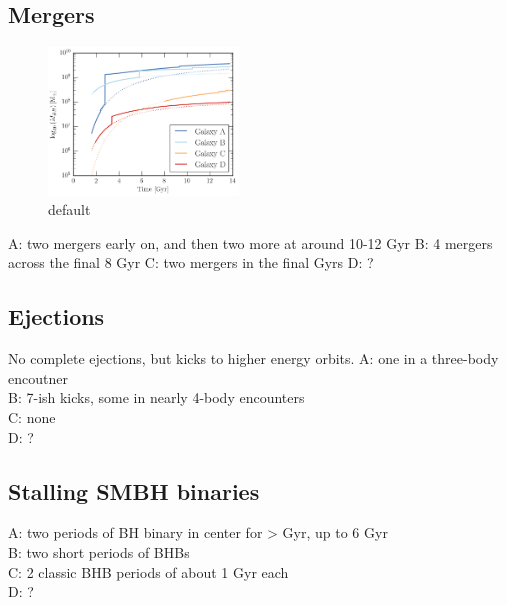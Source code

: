 \documentclass[english, apj]{emulateapj}
\begin{document}
\subsection{Mergers}
\begin{figure}[htbp]
\begin{center}
\includegraphics[width=0.45\textwidth]{plots/masses_ABCD.png}
\caption{default}
\label{default4}
\end{center}
\end{figure}




\noindent A: two mergers early on, and then two more at around 10-12 Gyr
B: 4 mergers across the final 8 Gyr
C: two mergers in the final Gyrs
D: ?


\subsection{Ejections}
No complete ejections, but kicks to higher energy orbits.
\noindent A: one in a three-body encoutner\\
B: 7-ish kicks, some in nearly 4-body encounters\\
C: none\\
D: ?\\

\subsection{Stalling SMBH binaries}
A: two periods of BH binary in center for > Gyr, up to 6 Gyr\\
B: two short periods of BHBs\\
C: 2 classic BHB periods of about 1 Gyr each\\
D: ?
\end{document}
